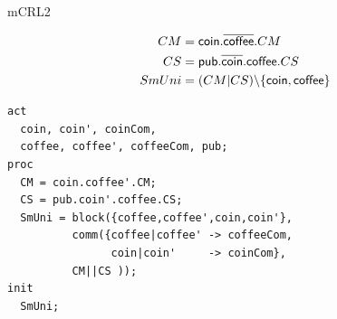 \documentclass[aspectratio=169]{beamer}
\begin{document}
\begin{frame}[fragile]{mCRL2}
\small

\vspace*{-8mm}
\begin{align*}
    CM &= \mathsf{coin.\overline{coffee}}.CM
    \\
    CS &= \mathsf{pub.\overline{coin}.coffee}.CS
    \\
    SmUni &= (CM|CS) \backslash \mathsf{\left\{ coin,coffee \right\}}
\end{align*}

\vspace*{-4mm}
\begin{lstlisting}
act
  coin, coin', coinCom,
  coffee, coffee', coffeeCom, pub;
proc
  CM = coin.coffee'.CM;
  CS = pub.coin'.coffee.CS;
  SmUni = block({coffee,coffee',coin,coin'},
          comm({coffee|coffee' -> coffeeCom,
                coin|coin'     -> coinCom},
          CM||CS ));
init
  SmUni;
\end{lstlisting}
\end{frame}
\end{document}
